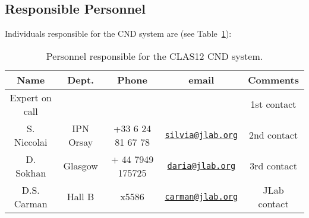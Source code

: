 \subsection{Responsible Personnel}

Individuals responsible for the CND system are (see Table~\ref{tb:cnd}):

\begin{table}[!htb]
\centering
\begin{tabular}{|c|c|c|c|c|} \hline
Name&Dept.&Phone&email&Comments \\ \hline
Expert on call& &&& 1st contact \\ \hline
S. Niccolai & IPN Orsay&+33 6 24 81 67 78&\href{mailto:silvia@jlab.org}{\nolinkurl{silvia@jlab.org}}& 2nd contact \\ \hline
D. Sokhan   & Glasgow  & + 44 7949 175725 &\href{mailto:daria@jlab.org}{\nolinkurl{daria@jlab.org}} & 3rd contact  \\ \hline
D.S. Carman & Hall B & x5586 & \href{mailto:carman@jlab.org}{\nolinkurl{carman@jlab.org}} & JLab contact \\ \hline
\end{tabular}
\caption{Personnel responsible for the CLAS12 CND system.} 
\label{tb:cnd}
\end{table}

